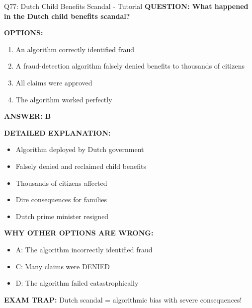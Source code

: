\documentclass[8pt]{beamer}
\begin{document}
	\begin{frame}{Q77: Dutch Child Benefits Scandal - Tutorial}
		\fontsize{6.5}{7.5}\selectfont
		\textbf{QUESTION: What happened in the Dutch child benefits scandal?}
		
		\vspace{0.1cm}
		\textbf{OPTIONS:}
		\begin{enumerate}
			\item An algorithm correctly identified fraud
			\item A fraud-detection algorithm falsely denied benefits to thousands of citizens
			\item All claims were approved
			\item The algorithm worked perfectly
		\end{enumerate}
		
		\vspace{0.1cm}
		\textcolor{myblue}{\textbf{ANSWER: B}}
		
		\vspace{0.1cm}
		\textbf{DETAILED EXPLANATION:}
		\begin{itemize}
			\item Algorithm deployed by Dutch government
			\item Falsely denied and reclaimed child benefits
			\item Thousands of citizens affected
			\item Dire consequences for families
			\item Dutch prime minister resigned
		\end{itemize}
		
		\vspace{0.1cm}
		\textcolor{myred}{\textbf{WHY OTHER OPTIONS ARE WRONG:}}
		\begin{itemize}
			\item \textcolor{myred}{A:} The algorithm incorrectly identified fraud
			\item \textcolor{myred}{C:} Many claims were DENIED
			\item \textcolor{myred}{D:} The algorithm failed catastrophically
		\end{itemize}
		
		\textcolor{myred}{\textbf{EXAM TRAP:}} Dutch scandal = \textcolor{myblue}{algorithmic bias with severe consequences}!
	\end{frame}
	
\end{document}
